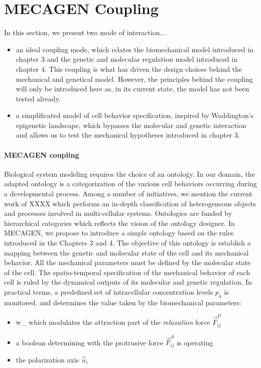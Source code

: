

\section{MECAGEN Coupling  }

  In this section, we present two mode of interaction... 
\begin{itemize}
	\item an ideal coupling mode, which relates the biomechanical model introduced in chapter 3 and the genetic and molecular regulation model introduced in chapter 4. This coupling is what has driven the design choices behind the mechanical and genetical model. However, the principles behind the coupling will only be introduced here as, in its current state, the model has not been tested already.
	\item a simplificated model of cell behavior specification, inspired by Waddington's epigenetic landscape, which bypasses the molecular and genetic interaction and allows us to test the mechanical hypotheses introduced in chapter 3.
\end{itemize}

\paragraph{MECAGEN coupling}

  Biological system modeling requires the choice of an ontology. In our domain, the adapted ontology is a categorization of the various cell behaviors occurring during a developmental process.   Among a number of initiatives, we mention the current work of XXXX which performs an in-depth classification of heterogeneous objects and processes involved in multi-cellular systems.   Ontologies are funded by hierarchical categories which reflects the vision of the ontology designer.    In MECAGEN, we propose to introduce a simple ontology based on the rules introduced in the Chapters 3 and 4.   The objective of this ontology is establish a mapping between the genetic and molecular state of the cell and its mechanical behavior.   All the mechanical parameters must be defined by the molecular state of the cell. The spatio-temporal specification of the mechanical behavior of each cell is ruled by the dynamical outputs of its molecular and genetic regulation.    In practical terms, a predefined set of intracellular concentration levels $p_a$ is monitored, and determines the value taken by the biomechanical parameters: 
\begin{itemize}
	\item w_{} which modulates the attraction part of the \textit{relaxation} force $\vec{F}^P_{ij}$
	\item a boolean determining with the protrusive force $\vec{F}^A_{ij}$ is operating
	\item the polarization axis $\vec{u}_i$
\end{itemize}

